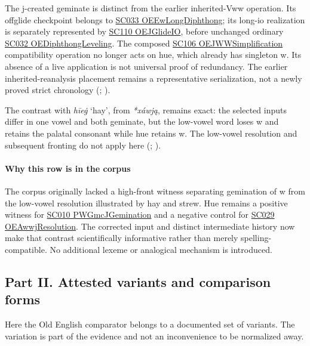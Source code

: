 \documentclass[
  british,
  a4paper,
]{article}
\begin{document}
The j-created geminate is distinct from the earlier inherited-Vww
operation. Its offglide checkpoint belongs to
\hyperref[rule-OEEwLongDiphthong]{SC033 OEEwLongDiphthong}; its long-io
realization is separately represented by
\hyperref[rule-OEJGlideIO]{SC110 OEJGlideIO}, before unchanged ordinary
\hyperref[rule-OEDiphthongLeveling]{SC032 OEDiphthongLeveling}. The
composed \hyperref[rule-OEJWWSimplification]{SC106 OEJWWSimplification}
compatibility operation no longer acts on hue, which already has
singleton w. Its absence of a live application is not universal proof of
redundancy. The earlier inherited-reanalysis placement remains a
representative serialization, not a newly proved strict chronology
(;
).

The contrast with \emph{hīeġ} `hay', from \emph{*xáwją}, remains exact:
the selected inputs differ in one vowel and both geminate, but the
low-vowel word loses w and retains the palatal consonant while hue
retains w. The low-vowel resolution and subsequent fronting do not apply
here (;
).

\paragraph{Why this row is in the
corpus}\label{why-this-row-is-in-the-corpus-3}

The corpus originally lacked a high-front witness separating gemination
of w from the low-vowel resolution illustrated by hay and strew. Hue
remains a positive witness for \hyperref[rule-PWGmcJGemination]{SC010
PWGmcJGemination} and a negative control for
\hyperref[rule-OEAwwjResolution]{SC029 OEAwwjResolution}. The corrected
input and distinct intermediate history now make that contrast
scientifically informative rather than merely spelling-compatible. No
additional lexeme or analogical mechanism is introduced.

\clearpage

\subsection{Part II. Attested variants and comparison
forms}\label{part-ii.-attested-variants-and-comparison-forms}

Here the Old English comparator belongs to a documented set of variants.
The variation is part of the evidence and not an inconvenience to be
normalized away.
\end{document}
